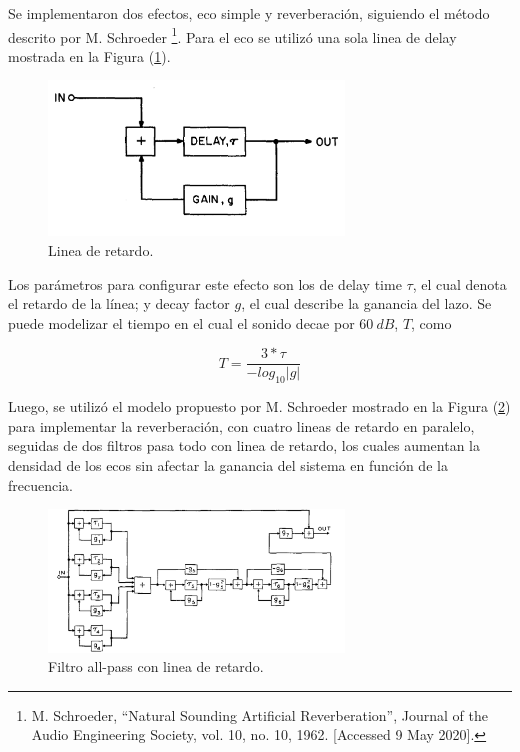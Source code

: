 Se implementaron dos efectos, eco simple y reverberación, siguiendo el método descrito por M. Schroeder \footnote{M. Schroeder, ``Natural Sounding Artificial Reverberation'', Journal of the Audio Engineering Society, vol. 10, no. 10, 1962. [Accessed 9 May 2020].}. Para el eco se utilizó una sola linea de delay mostrada en la Figura (\ref{delay}).
\begin{figure}[H]
	\centering
	\includegraphics[width=0.7\textwidth]{ImagenesEjercicio6/delay.png}
	\caption{Linea de retardo.}
	\label{delay}
\end{figure}

Los parámetros para configurar este efecto son los de delay time $\tau$, el cual denota el retardo de la línea; y decay factor $g$, el cual describe la ganancia del lazo. Se puede modelizar el tiempo en el cual el sonido decae por $60 \ dB$, $T$, como

\begin{equation}
T = \frac{3*\tau }{-log_{10} | g | }
\label{delayeq}
\end{equation}

Luego, se utilizó el modelo propuesto por M. Schroeder mostrado en la Figura (\ref{rev}) para implementar la reverberación, con cuatro lineas de retardo en paralelo, seguidas de dos filtros pasa todo con linea de retardo, los cuales aumentan la densidad de los ecos sin afectar la ganancia del sistema en función de la frecuencia.

\begin{figure}[H]
	\centering
	\includegraphics[width=0.7\textwidth]{ImagenesEjercicio6/rev.png}
	\caption{Filtro all-pass con linea de retardo.}
	\label{rev}
\end{figure}

